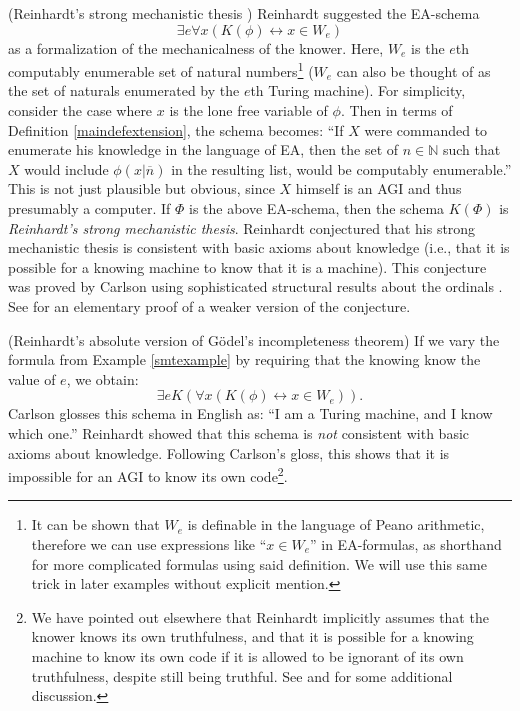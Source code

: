 \documentclass[runningheads]{llncs}
\begin{document}
\begin{example}
\label{smtexample}
    (Reinhardt's strong mechanistic thesis
    \cite{reinhardt1985absolute} \cite{reinhardt1986epistemic}
    \cite{carlson}) Reinhardt suggested the
    EA-schema
    \[\exists e \forall x ( K(\phi) \leftrightarrow x\in W_e)\]
    as a formalization of the mechanicalness of the knower. Here, $W_e$
    is the $e$th computably enumerable set of natural numbers\footnote{It can be
    shown that $W_e$ is definable in the language of Peano arithmetic, therefore we
    can use expressions like ``$x\in W_e$'' in EA-formulas, as shorthand for more
    complicated formulas using said definition. We will use this same trick in later
    examples without explicit mention.} ($W_e$ can also
    be thought of as the set of naturals enumerated by the $e$th Turing machine).
    For simplicity, consider the case where $x$ is the lone free variable
    of $\phi$. Then in terms of Definition \ref{maindefextension}, the schema
    becomes:
    ``If $X$ were commanded to enumerate his knowledge in the language of EA,
    then the set of $n\in\mathbb N$ such that $X$ would include $\phi(x|\overline n)$
    in the resulting list, would be computably enumerable.''
    This is not just plausible but obvious, since $X$ himself
    is an AGI and thus presumably a computer.
    If $\Phi$ is the above EA-schema, then the schema $K(\Phi)$ is \emph{Reinhardt's
    strong mechanistic thesis}. Reinhardt conjectured that his strong mechanistic
    thesis is consistent with basic axioms about knowledge (i.e., that it is
    possible for a knowing machine to know that it is a machine).
    This conjecture was proved by Carlson \cite{carlson} using sophisticated
    structural results about the ordinals \cite{carlson1999}.
    See \cite{alexander2015fast} for an elementary proof of a weaker
    version of the conjecture.
\end{example}

\begin{example}
\label{reinhardtnegativeexample}
  (Reinhardt's absolute version of G\"odel's incompleteness theorem)
  If we vary the formula from Example \ref{smtexample} by requiring that the
  knowing know the value of $e$, we obtain:
  \[
    \exists e K(\forall x ( K(\phi) \leftrightarrow x\in W_e)).
  \]
  Carlson \cite{carlson} glosses this schema in English as:
  ``I am a Turing machine, and I know which one.''
  Reinhardt showed that this schema is \emph{not} consistent with basic
  axioms about knowledge. Following Carlson's gloss, this shows
  that it is impossible for an AGI to know its own code\footnote{We have
  pointed out elsewhere \cite{alexander2014machine} that Reinhardt
  implicitly assumes that the knower knows its own truthfulness, and that
  it is possible for a knowing machine to know its own code if it is allowed to
  be ignorant of its own truthfulness, despite still being truthful.
  See \cite{aldini2015self} and \cite{aldini2015theory} for some additional discussion.}.
\end{example}
\end{document}
